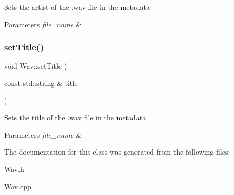 Sets the artist of the .wav file in the metadata 
\begin{DoxyParams}{Parameters}
{\em file\+\_\+name} & \\
\hline
\end{DoxyParams}
\mbox{\label{classWav_afa78c8a77ee91541fc13bfb9a71f0cfa}} 
\subsubsection{\texorpdfstring{set\+Title()}{setTitle()}}
{\footnotesize\ttfamily void Wav\+::set\+Title (\begin{DoxyParamCaption}\item[{const std\+::string \&}]{title }\end{DoxyParamCaption})}

Sets the title of the .wav file in the metadata 
\begin{DoxyParams}{Parameters}
{\em file\+\_\+name} & \\
\hline
\end{DoxyParams}


The documentation for this class was generated from the following files\+:\begin{DoxyCompactItemize}
\item 
Wav.\+h\item 
Wav.\+cpp\end{DoxyCompactItemize}
